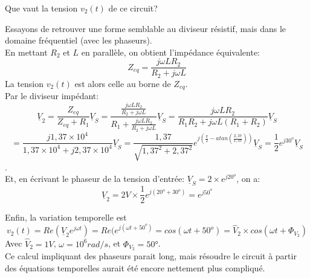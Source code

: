 { 
Que vaut la tension $v_2(t)$ de ce circuit?
}
{ 
Essayons de retrouver une forme semblable au diviseur résistif, mais dans le domaine fréquentiel (avec les phaseurs).\\
En mettant $R_2$ et $L$ en parallèle, on obtient l'impédance équivalente: $$Z_{eq}=\frac{j\omega LR_2}{R_2+j\omega L}$$
La tension $v_2(t)$ est alors celle au borne de $Z_{eq}$.\\
Par le diviseur impédant:
$$\underline{V}_2=\frac{Z_{eq}}{Z_{eq}+R_1}\underline{V}_S=\frac{\frac{j\omega LR_2}{R_2+j\omega L}}{R_1+\frac{j\omega LR_2}{R_2+j\omega L}}\underline{V}_S=\frac{j\omega LR_2}{R_1R_2+j\omega L(R_1+R_2)}\underline{V}_S$$
$$=\frac{j1,37\times 10^4}{1,37\times 10^4+j2,37\times 10^4}\underline{V}_S=\frac{1,37}{\sqrt{1,37^2+2,37^2}}e^{j(\frac{\pi}{2}-atan(\frac{2,37}{1,37}))}\underline{V}_S=\frac{1}{2}e^{j30^o}\underline{V}_S$$.\\

Et, en écrivant le phaseur de la tension d'entrée: $\underline{V}_S=2\times e^{j20^o}$, on a:
$$\underline{V}_2=2V\times \frac{1}{2}e^{j(20^o+30^o)}=e^{j50^o}$$

Enfin, la variation temporelle est
$$v_2(t)=Re(\underline{V}_2e^{j\omega t})=Re(e^{j(\omega t+50^o)}=cos(\omega t+50^o)=\widehat{V}_2\times cos(\omega t+ \Phi_{V_2})$$
Avec $\widehat{V}_2=1V$, $\omega=10^6rad/s$, et $\Phi_{V_2}=50°$.\\

Ce calcul impliquant des phaseurs parait long, mais résoudre le circuit à partir des équations temporelles aurait été encore nettement plus compliqué.

}


